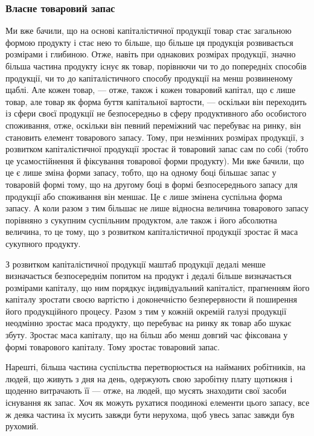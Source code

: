 \parcont{}  %
\subsubsection{Власне товаровий запас}

Ми вже бачили, що на основі капіталістичної продукції товар стає
загальною формою продукту і стає нею то більше, що більше ця продукція
розвивається розмірами і глибиною. Отже, навіть при однакових
розмірах продукції, значно більша частина продукту існує як товар, порівнючи
чи то до попередніх способів продукції, чи то до капіталістичного
способу продукції на менш розвиненому щаблі. Але кожен товар,
— отже, також і кожен товаровий капітал, що є лише товар, але товар
як форма буття капітальної вартости, — оскільки він переходить із
сфери своєї продукції не безпосередньо в сферу продуктивного або
особистого споживання, отже, оскільки він певний переміжний час
перебуває на ринку, він становить елемент товарового запасу. Тому,
при незмінних розмірах продукції, з розвитком капіталістичної продукції
зростає й товаровий запас сам по собі (тобто це усамостійнення й фіксування
товарової форми продукту). Ми вже бачили, що це є лише зміна
форми запасу, тобто, що на одному боці більшає запас у товаровій
формі тому, що на другому боці в формі безпосереднього запасу для
продукції або споживання він меншає. Це є лише змінена суспільна
форма запасу. А коли разом з тим більшає не лише відносна величина
товарового запасу порівняно з сукупним суспільним продуктом, але також
і його абсолютна величина, то це тому, що з розвитком капіталістичної
продукції зростає й маса сукупного продукту.

З розвитком капіталістичної продукції маштаб продукції дедалі менше
визначається безпосереднім попитом на продукт і дедалі більше визначається
розмірами капіталу, що ним порядкує індивідуальний капіталіст,
прагненням його капіталу зростати своєю вартістю і доконечністю безперервности
й поширення його продукційного процесу. Разом з тим у
кожній окремій галузі продукції неодмінно зростає маса продукту, що
перебуває на ринку як товар або шукає збуту. Зростає маса капіталу, що
на більш або менш довгий час фіксована у формі товарового капіталу.
Тому зростає товаровий запас.

Нарешті, більша частина суспільства перетворюється на найманих
робітників, на людей, що живуть з дня на день, одержують свою заробітну
плату щотижня і щоденно витрачають її — отже, на людей, що
мусять знаходити свої засоби існування як запас. Хоч як можуть рухатися
поодинокі елементи цього запасу, все ж деяка частина їх мусить
завжди бути нерухома, щоб увесь запас завжди був рухомий.

